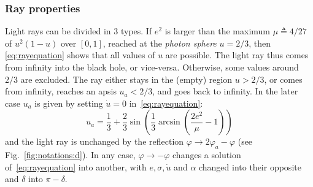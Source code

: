 \documentclass{document}
\begin{document}
\subsubsection{Ray properties}\label{sec:properties}

Light rays can be divided in 3 types. If $e^2$ is larger than the maximum $\mu 
\triangleq 4 / 27$ of $u^2 (1 - u)$ over $[0,1]$, reached at the {\em photon 
sphere} $u = 2 / 3$, then \eqref{eq:rayequation} shows that all values of $u$ 
are possible. The light ray thus comes from infinity into the black hole, or 
vice-versa. Otherwise, some values around $2 / 3$ are excluded. The ray either 
stays in the (empty) region $u > 2 / 3$, or comes from infinity, reaches an 
apsis $u_a < 2 / 3$, and goes back to infinity. In the later case $u_a$ is 
given by setting $\dot{u} = 0$ in~\eqref{eq:rayequation}:
\begin{equation}
u_a=\frac{1}{3} + \frac{2}{3}
\sin\left(\frac{1}{3} \arcsin\left(\frac{2e^2}{\mu} - 1\right)\right)
\label{eq:uapsis}
\end{equation}
and the light ray is unchanged by the reflection $\varphi \rightarrow 
2\varphi_a - \varphi$ (see Fig.~\ref{fig:notations:d}). In any case, $\varphi 
\rightarrow -\varphi$ changes a solution of~\eqref{eq:rayequation} into 
another, with $e, \sigma, \dot{u}$ and $\alpha$ changed into their opposite and 
$\delta$ into $\pi - \delta$.
\end{document}

